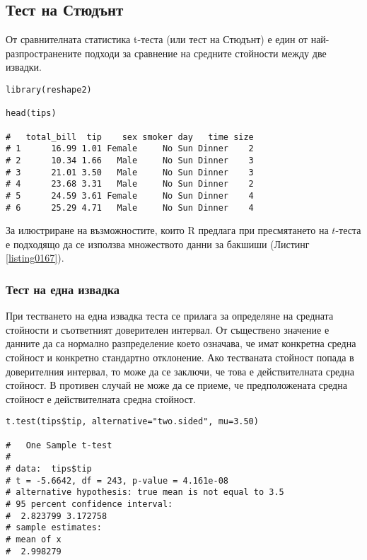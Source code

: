 \subsection{Тест на Стюдънт}

От сравнителната статистика t-теста (или тест на Стюдънт) е един от най-разпространените подходи за сравнение на средните стойности между две извадки. 

\begin{lstlisting}[caption=Тестово множество за бакшиши, label=listing0167]
library(reshape2)

head(tips)

#   total_bill  tip    sex smoker day   time size
# 1      16.99 1.01 Female     No Sun Dinner    2
# 2      10.34 1.66   Male     No Sun Dinner    3
# 3      21.01 3.50   Male     No Sun Dinner    3
# 4      23.68 3.31   Male     No Sun Dinner    2
# 5      24.59 3.61 Female     No Sun Dinner    4
# 6      25.29 4.71   Male     No Sun Dinner    4
\end{lstlisting}

За илюстриране на възможностите, които R предлага при пресмятането на $t$-теста е подходящо да се използва множеството данни за бакшиши (Листинг \ref{listing0167}).

\subsubsection{Тест на една извадка}

При тестването на една извадка теста се прилага за определяне на средната стойности и съответният доверителен интервал. От съществено значение е данните да са нормално разпределение което означава, че имат конкретна средна стойност и конкретно стандартно отклонение. Ако тестваната стойност попада в доверителния интервал, то може да се заключи, че това е действителната средна стойност. В противен случай не може да се приеме, че предположената средна стойност е действителната средна стойност. 

\begin{lstlisting}[caption=Тест на единична извадка, label=listing0168]
t.test(tips$tip, alternative="two.sided", mu=3.50)

# 	One Sample t-test
# 
# data:  tips$tip
# t = -5.6642, df = 243, p-value = 4.161e-08
# alternative hypothesis: true mean is not equal to 3.5
# 95 percent confidence interval:
#  2.823799 3.172758
# sample estimates:
# mean of x 
#  2.998279 
\end{lstlisting}

